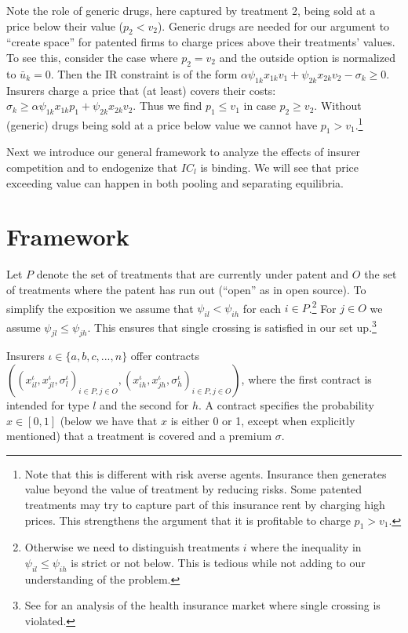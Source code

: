 \documentclass[a4paper,12pt]{article}
\begin{document}
Note the role of generic drugs, here captured by treatment 2, being sold at a price below their value (\(p_2 < v_2\)). Generic drugs are needed for our argument to ``create space'' for patented firms to charge prices above their treatments' values. To see this, consider the case where \(p_2=v_2\) and the outside option is normalized to \(\bar u_k = 0\). Then the IR constraint is of the form \(\alpha \psi_{1k} x_{1k} v_1 + \psi_{2k}x_{2k}v_2 - \sigma_k \geq 0\). Insurers charge a price that (at least) covers their costs: \(\sigma_k \geq \alpha \psi_{1k} x_{1k} p_1 + \psi_{2k} x_{2k} v_2\). Thus we find \(p_1 \leq v_1\) in case \(p_2 \geq v_2\). Without (generic) drugs being sold at a price below value we cannot have \(p_1 > v_1\).\footnote{Note that this is different with risk averse agents. Insurance then generates value beyond the value of treatment by reducing risks. Some patented treatments may try to capture part of this insurance rent by charging high prices. This strengthens the argument that it is profitable to charge \(p_1>v_1\).}

Next we introduce our general framework to analyze the effects of insurer competition and to endogenize that \(IC_l\) is binding. We will see that price exceeding value can happen in both pooling and separating equilibria.

\section{Framework}
\label{sec:org6e9738f}

Let \(P\) denote the set of treatments that are currently under patent and \(O\) the set of treatments where the patent has run out (``open'' as in open source). To simplify the exposition we assume that \(\psi_{il}<\psi_{ih}\) for each \(i \in P\).\footnote{Otherwise we need to distinguish treatments \(i\) where the inequality in \(\psi_{il} \leq \psi_{ih}\) is strict or not below. This is tedious while not adding to our understanding of the problem.} For \(j \in O\) we assume \(\psi_{jl} \leq \psi_{jh}\). This ensures that single crossing is satisfied in our set up.\footnote{See \cite{BooneS13} for an analysis of the health insurance market where single crossing is violated.}

Insurers \(\iota \in \{a,b,c,...,n\}\) offer contracts \(((x_{il}^{\iota},x_{jl}^{\iota},\sigma_l^{\iota})_{i \in P, j \in O},(x_{ih}^{\iota},x_{jh}^{\iota},\sigma_h^{\iota})_{i \in P, j \in O})\), where the first contract is intended for type \(l\) and the second for \(h\). A contract specifies the probability \(x \in [0,1]\) (below we have that \(x\) is either 0 or 1, except when explicitly mentioned) that a treatment is covered and a premium \(\sigma\).
\end{document}
